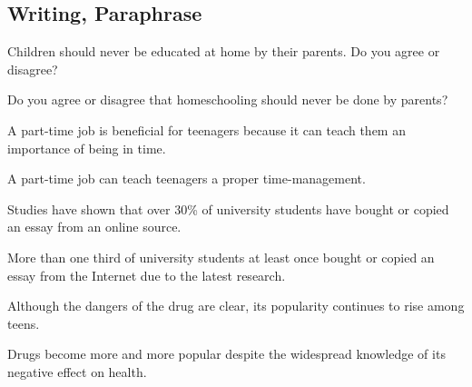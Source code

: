 \subsection*{Writing, Paraphrase}
Children should never be educated at home by their parents. 
Do you agree or disagree?

\begin{answer}
Do you agree or disagree that homeschooling should never be done by parents?
\end{answer}

A part-time job is beneficial for teenagers because it can teach them an importance of being in time.

\begin{answer}
A part-time job can teach teenagers a proper time-management. 
\end{answer}

Studies have shown that over 30\% of university students have bought or copied an essay from an online source.

\begin{answer}
More than one third of university students at least once bought or copied an essay from the Internet due to the latest research.
\end{answer}

Although the dangers of the drug are clear, its popularity continues to rise among teens.

\begin{answer}
Drugs become more and more popular despite the widespread knowledge of its negative effect on health.
\end{answer}
